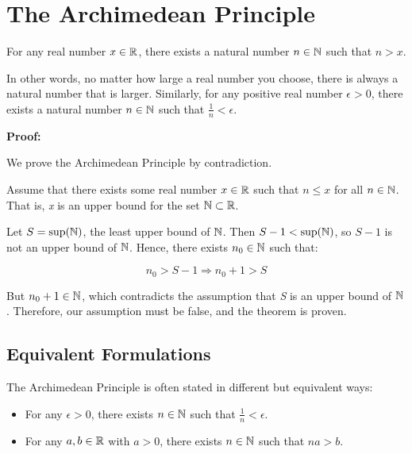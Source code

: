 \newpage
\section{The Archimedean Principle}

For any real number \( x \in \mathbb{R} \), there exists a natural number \( n \in \mathbb{N} \) such 
that \( n > x \).
\vspace{\baselineskip}

In other words, no matter how large a real number you choose, there is always a natural number that 
is larger. Similarly, for any positive real number \( \epsilon > 0 \), there exists a natural number 
\( n \in \mathbb{N} \) such that \( \frac{1}{n} < \epsilon \).
\vspace{\baselineskip}

\textbf{Proof:}

We prove the Archimedean Principle by contradiction.
\vspace{\baselineskip}

Assume that there exists some real number \( x \in \mathbb{R} \) such that \( n \leq x \) for all 
\( n \in \mathbb{N} \). That is, \emph{x} is an upper bound for the set \( \mathbb{N} \subset \mathbb{R}\).
\vspace{\baselineskip}

Let \( S = \sup(\mathbb{N}) \), the least upper bound of \( \mathbb{N} \). Then 
\( S - 1 < \sup(\mathbb{N}) \), so \( S - 1 \) is not an upper bound of \( \mathbb{N} \). Hence, 
there exists \( n_0 \in \mathbb{N} \) such that:

\[
	n_0 > S - 1 \Rightarrow n_0 + 1 > S
\]

But \( n_0 + 1 \in \mathbb{N} \), which contradicts the assumption that \emph{S} is an upper bound of 
\(\mathbb{N} \). Therefore, our assumption must be false, and the theorem is proven.

\QED

\subsection{Equivalent Formulations}

The Archimedean Principle is often stated in different but equivalent ways:

\begin{itemize}
	
	\item For any \( \epsilon > 0 \), there exists \( n \in \mathbb{N} \) such that \( \frac{1}{n} < 
		  \epsilon \).
	
	\item For any \( a, b \in \mathbb{R} \) with \( a > 0 \), there exists \( n \in \mathbb{N} \) such that 
	      \( na > b \).

\end{itemize}

